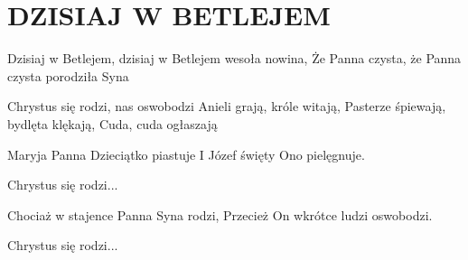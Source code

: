 \documentclass[../../../songbook.tex]{subfiles}
\begin{document}
\TabPositions{9cm} %
\section*{DZISIAJ W BETLEJEM}
{}
\vspace{0.5cm}
Dzisiaj w Betlejem, dzisiaj w Betlejem wesoła nowina,	   \newline         
Że Panna czysta, że Panna czysta porodziła Syna		 \newline   

\-\hspace{1cm} Chrystus się rodzi, nas oswobodzi	 \newline    
\-\hspace{1cm} Anieli grają, króle witają,			 \newline              
\-\hspace{1cm} Pasterze śpiewają, bydlęta klękają,	 \newline   
\-\hspace{1cm} Cuda, cuda ogłaszają				 \newline   

Maryja Panna Dzieciątko piastuje 		\newline
I Józef święty Ono pielęgnuje. 		\newline

\-\hspace{1cm} Chrystus się rodzi... 		\newline

Chociaż w stajence Panna Syna rodzi, 		\newline
Przecież On wkrótce ludzi oswobodzi. 		\newline

\-\hspace{1cm} Chrystus się rodzi... 		\newline
\end{document}
